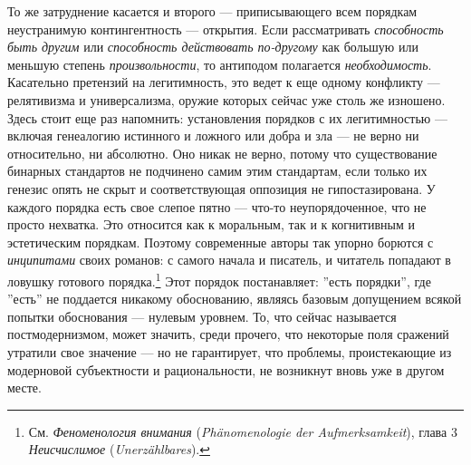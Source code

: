 \documentclass[12pt]{book}
\begin{document}
То же затруднение касается и второго --- приписывающего всем порядкам неустранимую контингентность --- открытия. Если рассматривать \textit{способность быть другим} или \textit{способность действовать по-другому} как большую или меньшую степень \textit{произвольности}, то антиподом полагается \textit{необходимость}. Касательно претензий на легитимность, это ведет к еще одному конфликту --- релятивизма и универсализма, оружие которых сейчас уже столь же изношено. Здесь стоит еще раз напомнить: установления порядков с их легитимностью --- включая генеалогию истинного и ложного или добра и зла --- не верно ни относительно, ни абсолютно. Оно никак не верно, потому что существование бинарных стандартов не подчинено самим этим стандартам, если только их генезис опять не скрыт и соответствующая оппозиция не гипостазирована. У каждого порядка есть свое слепое пятно --- что-то неупорядоченное, что не просто нехватка. Это относится как к моральным, так и к когнитивным и эстетическим порядкам. Поэтому современные авторы так упорно борются с \textit{инципитами} своих романов: с самого начала и писатель, и читатель попадают в ловушку готового порядка.\footnote{См. \textit{Феноменология внимания} (\textit{Phänomenologie der Aufmerksamkeit}), глава 3 \textit{Неисчислимое} (\textit{Unerzählbares}).} Этот порядок постанавляет: ''есть порядки'', где ''есть'' не поддается никакому обоснованию, являясь базовым допущением всякой попытки обоснования --- нулевым уровнем. То, что сейчас называется постмодернизмом, может значить, среди прочего, что некоторые поля сражений утратили свое значение --- но не гарантирует, что проблемы, проистекающие из модерновой субъектности и рациональности, не возникнут вновь уже в другом месте.
\end{document}
